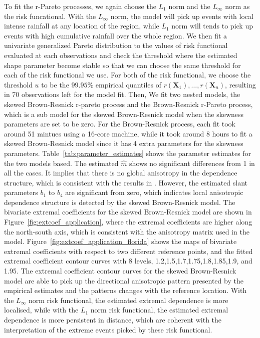 \documentclass[12pt]{article}
\begin{document}
To fit the r-Pareto processes, we again choose the $L_1$ norm and the $L_\infty$ norm as the risk funcational. With the $L_\infty$ norm, the model will pick up events with local intense rainfall at any location of the region, while $L_1$ norm will tends to pick up events with high cumulative rainfall over the whole region. We then fit a univariate generalized Pareto distribution to the values of risk functional evaluated at each observations and check the threshold where the estimated shape parameter become stable so that we can choose the same threshold for each of the risk functional we use. For both of the risk functional, we choose the threshold $u$ to be the $99.95\%$ empirical quantiles of $r(\bm X_1),\dots,r(\bm X_n)$, resulting in 70 observations left for the model fit. Then, We fit two nested models, the skewed Brown-Resnick r-pareto process and the Brown-Resnick r-Pareto process, which is a sub model for the skewed Brown-Resnick model when the skewness parameters are set to be zero. For the Brown-Resnick process, each fit took around 51 mintues using a 16-core machine, while it took around 8 hours to fit a skewed Brown-Resnick model since it has 4 extra parameters for the skewness parameters. Table~\ref{tab:parameter_estimates} shows the parameter estimates for the two models based. The estimated $\hat m$ shows no significant differences from 1 in all the cases. It implies that there is no global anisotropy in the dependence structure, which is consistent with the results in \cite{deFondeville.Davison:2018}. However, the estimated slant parameters $b_1$ to $b_4$ are significant from zero, which indicates local anisotropic dependence structure is detected by the skewed Brown-Resnick model. The bivariate extremal coefficients for the skewed Brown-Resnick model are shown in Figure~\ref{fig:extcoef_application}, where the extremal coefficients are higher along the north-south axis, which is consistent with the anisotropy matrix used in the model. Figure~\ref{fig:extcoef_application_florida} shows the maps of bivariate extremal coefficients with respect to two different reference points, and the fitted extremal coefficient contour curves with 8 levels, 1.2,1.5,1.7,1.75,1.8,1.85,1.9, and 1.95. The extremal coefficient contour curves for the skewed Brown-Resnick model are able to pick up the directional anisotropic pattern presented by the empirical estimates and the patterns changes with the reference location. With the $L_\infty$ norm risk functional, the estimated extremal dependence is more localised, while with the $L_1$ norm risk functional, the estimated extremal dependence is more persistent in distance, which are coherent with the interpretation of the extreme events picked by these risk functional. 
\end{document}
